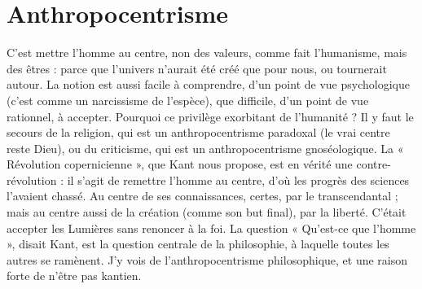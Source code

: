 \section{Anthropocentrisme}
C'est mettre l’homme au centre, non des valeurs,
comme fait l’humanisme, mais des êtres : parce
que l'univers n'aurait été créé que pour nous, ou tournerait autour. La notion
est aussi facile à comprendre, d’un point de vue psychologique (c’est comme un
narcissisme de l'espèce), que difficile, d’un point de vue rationnel, à accepter.
Pourquoi ce privilège exorbitant de l'humanité ? Il y faut le secours de la religion,
qui est un anthropocentrisme paradoxal (le vrai centre reste Dieu), ou du
criticisme, qui est un anthropocentrisme gnoséologique. La « Révolution
copernicienne », que Kant nous propose, est en vérité une contre-révolution : il
s’agit de remettre l’homme au centre, d’où les progrès des sciences l'avaient
chassé. Au centre de ses connaissances, certes, par le transcendantal ; mais au
centre aussi de la création (comme son but final), par la liberté. C'était accepter
les Lumières sans renoncer à la foi. La question « Qu'est-ce que l’homme »,
disait Kant, est la question centrale de la philosophie, à laquelle toutes les autres
se ramènent. J'y vois de l’anthropocentrisme philosophique, et une raison forte
de n’être pas kantien.

